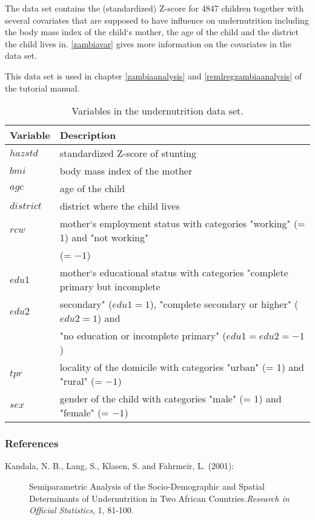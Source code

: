 The data set contains the (standardized) Z-score for 4847 children
together with several covariates that are supposed to have
influence on undernutrition including the body mass index of the
child`s mother, the age of the child and the district the child
lives in. \autoref{zambiavar} gives more information on the
covariates in the data set.

This data set is used in chapter \ref*{zambiaanalysis} and
\ref*{remlregzambiaanalysis} of the tutorial manual.

\begin{table}[|h|t|]
\begin{center}
\begin{tabular}{|l|l|}
 \hline
 {\bf Variable} & {\bf Description}\\
 \hline
 $hazstd$ & standardized Z-score of stunting\\
 $bmi$ & body mass index of the mother\\
 $agc$ & age of the child\\
 $district$ & district where the child lives\\
 $rcw$ & mother`s employment status with categories "working" (= 1) and "not working" \\
 & (= $-1$)\\
 $edu1$ & mother`s educational status with categories "complete primary but incomplete\\
 $edu2$ & secondary" ($edu1=1$), "complete secondary or higher" ($edu2=1$) and\\
 & "no education or incomplete primary" ($edu1=edu2=-1$)\\
 $tpr$ & locality of the domicile with categories "urban" (= 1) and "rural" (= $-1$)\\
 $sex$ & gender of the child with categories "male" (= 1) and
 "female" (= $-1$)\\
 \hline
\end{tabular}
{\em\caption{Variables in the undernutrition data set.
\label{zambiavar}}}
\end{center}
\end{table}

\subsubsection*{References}

\begin{description}
\item [Kandala, N. B., Lang, S., Klasen, S. and Fahrmeir, L. (2001):] Semiparametric Analysis of
the Socio-Demographic and Spatial Determinants of Undernutrition
in Two African Countries.{\it Research in Official Statistics}, 1,
81-100.
\end{description}
